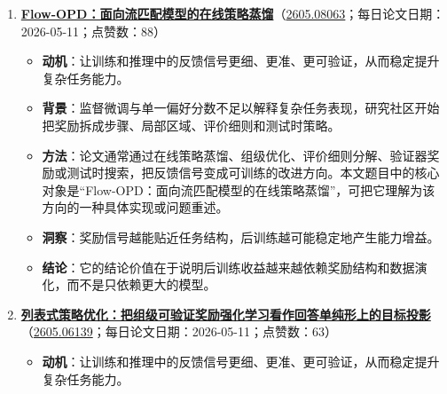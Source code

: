 \begin{enumerate}[leftmargin=1.5em]
  \begin{itemize}[leftmargin=1.5em]
    \item \textbf{动机}：让训练和推理中的反馈信号更细、更准、更可验证，从而稳定提升复杂任务能力。
    \item \textbf{背景}：监督微调与单一偏好分数不足以解释复杂任务表现，研究社区开始把奖励拆成步骤、局部区域、评价细则和测试时策略。
    \item \textbf{方法}：论文通常通过在线策略蒸馏、组级优化、评价细则分解、验证器奖励或测试时搜索，把反馈信号变成可训练的改进方向。本文题目中的核心对象是“G-Zero：从零数据开始的开放式生成自博弈”，可把它理解为该方向的一种具体实现或问题重述。
    \item \textbf{洞察}：生成模型的核心竞争正从单帧质量转向可控性、一致性和工作流可用性。
    \item \textbf{结论}：它的结论价值在于说明后训练收益越来越依赖奖励结构和数据演化，而不是只依赖更大的模型。
  \end{itemize}
  \item \textbf{\href{https://huggingface.co/papers/2605.08063}{Flow-OPD：面向流匹配模型的在线策略蒸馏}}（\href{https://arxiv.org/abs/2605.08063}{2605.08063}；每日论文日期：2026-05-11；点赞数：88）
  \begin{itemize}[leftmargin=1.5em]
    \item \textbf{动机}：让训练和推理中的反馈信号更细、更准、更可验证，从而稳定提升复杂任务能力。
    \item \textbf{背景}：监督微调与单一偏好分数不足以解释复杂任务表现，研究社区开始把奖励拆成步骤、局部区域、评价细则和测试时策略。
    \item \textbf{方法}：论文通常通过在线策略蒸馏、组级优化、评价细则分解、验证器奖励或测试时搜索，把反馈信号变成可训练的改进方向。本文题目中的核心对象是“Flow-OPD：面向流匹配模型的在线策略蒸馏”，可把它理解为该方向的一种具体实现或问题重述。
    \item \textbf{洞察}：奖励信号越能贴近任务结构，后训练越可能稳定地产生能力增益。
    \item \textbf{结论}：它的结论价值在于说明后训练收益越来越依赖奖励结构和数据演化，而不是只依赖更大的模型。
  \end{itemize}
  \item \textbf{\href{https://huggingface.co/papers/2605.06139}{列表式策略优化：把组级可验证奖励强化学习看作回答单纯形上的目标投影}}（\href{https://arxiv.org/abs/2605.06139}{2605.06139}；每日论文日期：2026-05-11；点赞数：63）
  \begin{itemize}[leftmargin=1.5em]
    \item \textbf{动机}：让训练和推理中的反馈信号更细、更准、更可验证，从而稳定提升复杂任务能力。

\end{itemize}
\end{enumerate}
